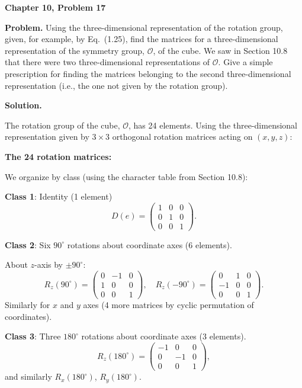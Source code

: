 \documentclass[12pt]{article}
\begin{document}
\begin{center}
{\Large\bfseries Chapter 10, Problem 17}
\end{center}

\noindent\textbf{Problem.} Using the three-dimensional representation of the rotation group, given, for example, by Eq.~(1.25), find the matrices for a three-dimensional representation of the symmetry group, $\mathscr{O}$, of the cube. We saw in Section 10.8 that there were two three-dimensional representations of $\mathscr{O}$. Give a simple prescription for finding the matrices belonging to the second three-dimensional representation (i.e., the one not given by the rotation group).

\bigskip
\noindent\textbf{Solution.}

The rotation group of the cube, $\mathscr{O}$, has 24 elements. Using the three-dimensional representation given by $3\times 3$ orthogonal rotation matrices acting on $(x, y, z)$:

\medskip
\noindent\textbf{The 24 rotation matrices:}

We organize by class (using the character table from Section 10.8):

\textbf{Class 1}: Identity (1 element)
\[
D(e) = \begin{pmatrix} 1 & 0 & 0 \\ 0 & 1 & 0 \\ 0 & 0 & 1 \end{pmatrix}.
\]

\textbf{Class 2}: Six $90^\circ$ rotations about coordinate axes (6 elements).

About $z$-axis by $\pm 90^\circ$:
\[
R_z(90^\circ) = \begin{pmatrix} 0 & -1 & 0 \\ 1 & 0 & 0 \\ 0 & 0 & 1 \end{pmatrix}, \quad
R_z(-90^\circ) = \begin{pmatrix} 0 & 1 & 0 \\ -1 & 0 & 0 \\ 0 & 0 & 1 \end{pmatrix}.
\]
Similarly for $x$ and $y$ axes (4 more matrices by cyclic permutation of coordinates).

\textbf{Class 3}: Three $180^\circ$ rotations about coordinate axes (3 elements).
\[
R_z(180^\circ) = \begin{pmatrix} -1 & 0 & 0 \\ 0 & -1 & 0 \\ 0 & 0 & 1 \end{pmatrix},
\]
and similarly $R_x(180^\circ)$, $R_y(180^\circ)$.
\end{document}
